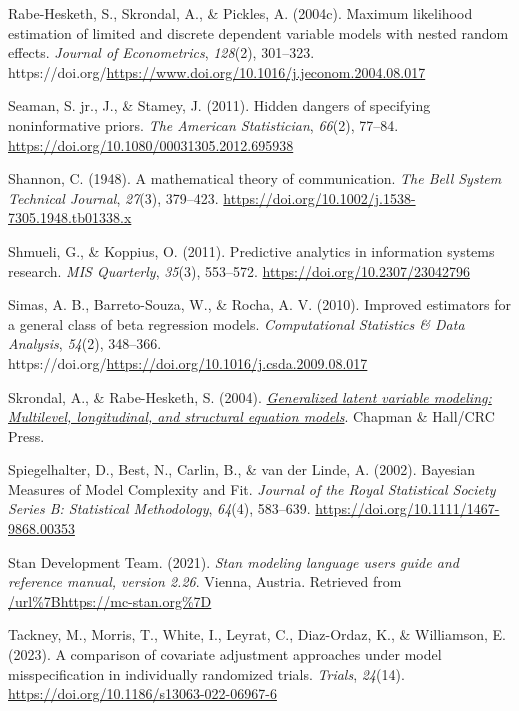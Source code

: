 \documentclass[
]{agujournal2019}
\newlength{\cslhangindent}
\newenvironment{CSLReferences}[2] %
 {\begin{list}{}{%
  \setlength{\itemindent}{0pt}
  \setlength{\leftmargin}{0pt}
  \setlength{\parsep}{0pt}
  \ifodd #1
   \setlength{\leftmargin}{\cslhangindent}
   \setlength{\itemindent}{-1\cslhangindent}
  \fi
  \setlength{\itemsep}{#2\baselineskip}}}
 {\end{list}}
\begin{document}
\begin{CSLReferences}{1}{0}
Rabe-Hesketh, S., Skrondal, A., \& Pickles, A. (2004c). Maximum
likelihood estimation of limited and discrete dependent variable models
with nested random effects. \emph{Journal of Econometrics},
\emph{128}(2), 301--323.
https://doi.org/\url{https://www.doi.org/10.1016/j.jeconom.2004.08.017}

Seaman, S. jr., J., \& Stamey, J. (2011). Hidden dangers of specifying
noninformative priors. \emph{The American Statistician}, \emph{66}(2),
77--84. \url{https://doi.org/10.1080/00031305.2012.695938}

Shannon, C. (1948). A mathematical theory of communication. \emph{The
Bell System Technical Journal}, \emph{27}(3), 379--423.
\url{https://doi.org/10.1002/j.1538-7305.1948.tb01338.x}

Shmueli, G., \& Koppius, O. (2011). Predictive analytics in information
systems research. \emph{MIS Quarterly}, \emph{35}(3), 553--572.
\url{https://doi.org/10.2307/23042796}

Simas, A. B., Barreto-Souza, W., \& Rocha, A. V. (2010). Improved
estimators for a general class of beta regression models.
\emph{Computational Statistics \& Data Analysis}, \emph{54}(2),
348--366.
https://doi.org/\url{https://doi.org/10.1016/j.csda.2009.08.017}

Skrondal, A., \& Rabe-Hesketh, S. (2004). \emph{\href{}{Generalized
latent variable modeling: Multilevel, longitudinal, and structural
equation models}}. Chapman \& Hall/CRC Press.

Spiegelhalter, D., Best, N., Carlin, B., \& van der Linde, A. (2002).
{Bayesian Measures of Model Complexity and Fit}. \emph{Journal of the
Royal Statistical Society Series B: Statistical Methodology},
\emph{64}(4), 583--639. \url{https://doi.org/10.1111/1467-9868.00353}

Stan Development Team. (2021). \emph{Stan modeling language users guide
and reference manual, version 2.26}. Vienna, Austria. Retrieved from
\url{/url\%7Bhttps://mc-stan.org\%7D}

Tackney, M., Morris, T., White, I., Leyrat, C., Diaz-Ordaz, K., \&
Williamson, E. (2023). A comparison of covariate adjustment approaches
under model misspecification in individually randomized trials.
\emph{Trials}, \emph{24}(14).
\url{https://doi.org/10.1186/s13063-022-06967-6}


\end{CSLReferences}
\end{document}

